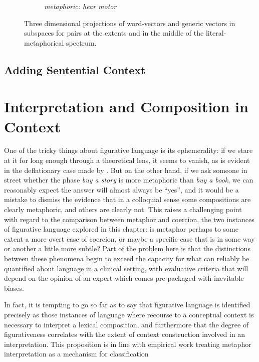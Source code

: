 \begin{figure}
\begin{subfigure}{0.3\textwidth}
\caption*{\footnotesize \emph{metaphoric: hear motor}}
\end{subfigure}
\caption{Three dimensional projections of word-vectors and generic vectors in subspaces for pairs at the extents and in the middle of the literal-metaphorical spectrum.}
\label{fig:relsimspaces}
\end{figure}

\subsection{Adding Sentential Context}

\section{Interpretation and Composition in Context}
One of the tricky things about figurative language is its ephemerality: if we stare at it for long enough through a theoretical lens, it seems to vanish, as is evident in the deflationary case made by \cite{WilsonEA}.  But on the other hand, if we ask someone in street whether the phase \emph{buy a story} is more metaphoric than \emph{buy a book}, we can reasonably expect the answer will almost always be ``yes'', and it would be a mistake to dismiss the evidence that in a colloquial sense some compositions are clearly metaphoric, and others are clearly not.  This raises a challenging point with regard to the comparison between metaphor and coercion, the two instances of figurative language explored in this chapter: is metaphor perhaps to some extent a more overt case of coercion, or maybe a specific case that is in some way or another a little more subtle?  Part of the problem here is that the distinctions between these phenomena begin to exceed the capacity for what can reliably be quantified about language in a clinical setting, with evaluative criteria that will depend on the opinion of an expert which comes pre-packaged with inevitable biases.



In fact, it is tempting to go so far as to say that figurative language is identified precisely as those instances of language where recourse to a conceptual context is necessary to interpret a lexical composition, and furthermore that the degree of figurativeness correlates with the extent of context construction involved in an interpretation.  This proposition is in line with  empirical work treating metaphor interpretation as a mechanism for classification

